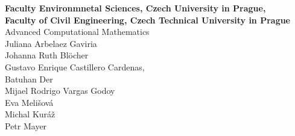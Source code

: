 
\begin{titlepage}

 
\begin{center}
 
 

 
{\textsf{\bfseries{Faculty Environmnetal Sciences, Czech University in Prague, \\ Faculty of Civil Engineering, Czech Technical University in Prague}}}\\[5.5cm]



\textsf{\LARGE Advanced Computational Mathematics}\\[1.0cm]
 

\textsf{ \large Juliana  Arbelaez Gaviria \\ Johanna Ruth Bl\"ocher \\ Gustavo Enrique Castillero Cardenas, \\ Batuhan Der \\ 
Mijael Rodrigo  Vargas Godoy \\ Eva Meli\v{s}ov\'a \\ Michal Kur\'a\v{z} \\ Petr Mayer} 
 
 \vspace{50mm}
{
 \large
\bf {} }
\end{center}
\end{titlepage}

